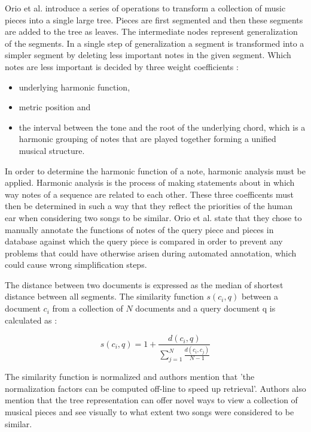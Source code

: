 \documentclass{llncs}
\begin{document}
\begin{itemize}
		Orio et al. \cite{two_point_four} introduce  a series of operations to transform a collection of music pieces into a single large tree. Pieces are first segmented and then these segments are added to the tree as leaves. The intermediate nodes represent generalization of the segments. 
		In a single step of generalization a segment is transformed into a simpler segment by deleting less important notes in the given segment. Which notes are less important is decided by three weight coefficients : 
		\begin{itemize}
			\item  underlying harmonic function, 
			\item  metric position  and 
			\item  the interval between the tone and the root of the underlying chord, which is a harmonic grouping of notes that are played together forming a unified musical structure.
		\end{itemize}	

		In order to determine the harmonic function of a note, harmonic analysis must be applied. Harmonic analysis is the process of making statements about in which way notes of a sequence are related to each other.
		These three coefficents must then be determined in such a way that they reflect the priorities of the human ear when considering two songs to be similar. 
		Orio et al. state that they chose to manually annotate the functions of notes of the query piece and pieces in database against which the query piece is compared   in order to prevent any problems that could have otherwise arisen during automated annotation, which could cause wrong simplification steps. 

		The distance between two documents is expressed as the median of shortest distance between all segments. The similarity function $s(c_i, q)$ between a document $c_i$ from a collection of $N$ documents and a query document q is calculated as :
		
		\begin{equation}
			s(c_i, q)= 1 + \frac{d(c_i, q)}{\sum_{j=1}^{N} \frac{d(c_i,c_j)}{N-1}} 
		\end{equation}

		The similarity function is normalized and authors mention that 'the normalization factors can be computed off-line to speed up retrieval'. Authors also mention that the tree representation can offer novel ways to view a collection of musical pieces and see visually to what extent two songs were considered to be similar.



\end{itemize}
\end{document}
